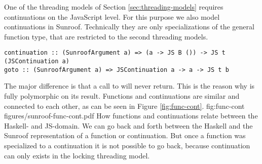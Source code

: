 One of the threading models of Section \ref{sec:threading-models} 
requires continuations on the JavaScript level. For this purpose we
also model continuations in Sunroof. Technically they are only
specializations of the general function type, that are 
restricted to the second threading models.
\begin{verbatim}
continuation :: (SunroofArgument a) => (a -> JS B ()) -> JS t (JSContinuation a)
goto :: (SunroofArgument a) => JSContinuation a -> a -> JS t b
\end{verbatim}
The major difference is that a call to  will never
return. This is the reason why  is fully polymorphic
on its result. Functions and continuations are similar and connected 
to each other, as can be seen in Figure \ref{fig:func-cont}.
\Figure%
{fig:func-cont}%
{figures/sunroof-func-cont.pdf}%
{How functions and continuations relate between the Haskell- and JS-domain.}%
We can go back and forth between the Haskell and the Sunroof
representation of a function or continuation. But once a function
was specialized to a continuation it is not possible to go back,
because continuation can only exists in the locking threading model.


\begin{comment}

\begin{table}
\caption{Reifying and calling JavaScript functions}
\begin{center}
\begin{tabular}{r@{\quad}c@{\quad}c@{\quad}c@{\quad}c}
\hline\rule{0pt}{12pt}%

                & Monadic Function      & Reification   & Object in     & Invocation\\
                & in Haskell            & Function      & Javascript    & Function\\
\hline\rule{0pt}{12pt}%
  Functions
  & $\alpha\rightarrow\ $\Src{JS}$_\Src{A}~\beta$
  & \Src{function}
  & \Src{JSFunction}~$\alpha~\beta$
  & \Src{apply} \\
  Continuations
  & $\alpha\rightarrow\ $\Src{JS}$_\Src{B}~\Src{()}$
  & \Src{continuation}
  & \Src{JSContinuation}~$\alpha$
  & \Src{goto}\\
\hline
\end{tabular}
\end{center}
\end{table}

\end{comment}

